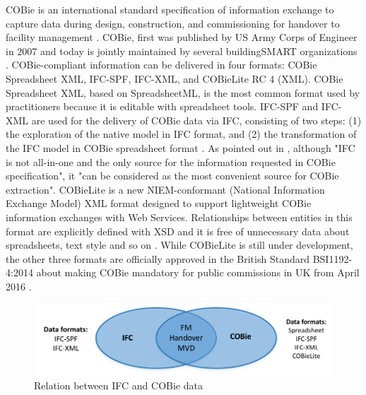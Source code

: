 COBie is an international standard specification of information exchange to capture data during design, construction, and commissioning for handover to facility management \cite{bentley2013cobie, east2007construction}.
COBie, first was published by US Army Corps of Engineer in 2007 and today is jointly maintained by several buildingSMART organizations \cite{day2014problem, karlshoj2016delivering}.
COBie-compliant information can be delivered in four formats: COBie Spreadsheet XML, IFC-SPF, IFC-XML, and COBieLite RC 4 (XML).
COBie Spreadsheet XML, based on SpreadsheetML, is the most common format used by practitioners because it is editable with spreadsheet tools.
IFC-SPF and IFC-XML are used for the delivery of COBie data via IFC, consisting of two steps: (1) the exploration of the native model in IFC format, and (2) the transformation of the IFC model in COBie spreadsheet format \cite{karlshoj2016delivering}. 
As pointed out in \cite{yalcinkaya2015examining}, although "IFC is not all-in-one and the only source for the information requested in COBie specification", it "can be considered as the most convenient source for COBie extraction".
COBieLite is a new NIEM-conformant (National Information Exchange Model) XML format designed to support lightweight COBie information exchanges with Web Services.
Relationships between entities in this format are explicitly defined with XSD and it is free of unnecessary data about spreadsheets, text style and so on \cite{bogen2015cobielite}.
While COBieLite is still under development, the other three formats are officially approved in the British Standard BSI1192-4:2014 about making COBie mandatory for public commissions in UK from April 2016 \cite{karlshoj2016delivering}.



\begin{figure}
    \centering    
    \includegraphics[width=\columnwidth]{images/ifc-and-cobie-2.pdf}
    \caption{Relation between IFC and COBie data}
    \label{fig:ifc-and-cobie}
\end{figure}












